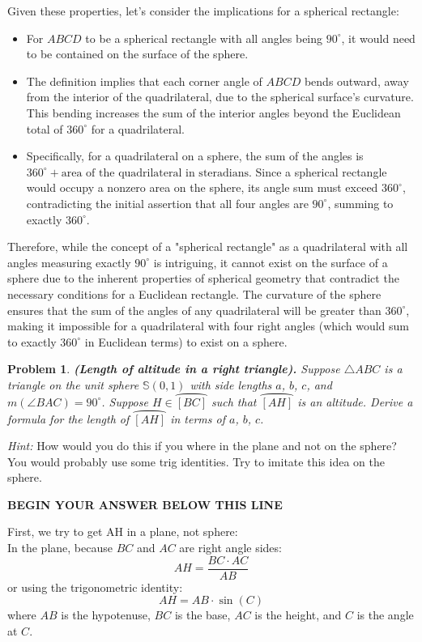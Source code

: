 \documentclass[letter,12pt]{article}
\newtheorem{problem}[main_theorem]{Problem}
\newcommand{\answerspacetop}{
	\begin{center}
		\textbf{BEGIN YOUR ANSWER BELOW THIS LINE} \\ \hrulefill
	\end{center}
}
\begin{document}
Given these properties, let's consider the implications for a spherical rectangle:
\begin{itemize}
	\item For $ABCD$ to be a spherical rectangle with all angles being $90^\circ$, it would need to be contained on the surface of the sphere.
	\item The definition implies that each corner angle of $ABCD$ bends outward, away from the interior of the quadrilateral, due to the spherical surface's curvature. This bending increases the sum of the interior angles beyond the Euclidean total of $360^\circ$ for a quadrilateral.
	\item Specifically, for a quadrilateral on a sphere, the sum of the angles is $360^\circ + \text{area of the quadrilateral in steradians}$. Since a spherical rectangle would occupy a nonzero area on the sphere, its angle sum must exceed $360^\circ$, contradicting the initial assertion that all four angles are $90^\circ$, summing to exactly $360^\circ$.
\end{itemize}

Therefore, while the concept of a "spherical rectangle" as a quadrilateral with all angles measuring exactly $90^\circ$ is intriguing, it cannot exist on the surface of a sphere due to the inherent properties of spherical geometry that contradict the necessary conditions for a Euclidean rectangle. The curvature of the sphere ensures that the sum of the angles of any quadrilateral will be greater than $360^\circ$, making it impossible for a quadrilateral with four right angles (which would sum to exactly $360^\circ$ in Euclidean terms) to exist on a sphere.
\pagebreak

\begin{problem} \textbf{(Length of altitude in a right triangle).} Suppose $\triangle ABC$ is a triangle on the unit sphere $\mathbb{S}(0, 1)$ with side lengths $a$, $b$, $c$, and $m(\angle BAC) = 90^\circ$. Suppose $H \in \wideparen{[BC]}$ such that $\wideparen{[AH]}$ is an altitude. Derive a formula for the length of $\wideparen{[AH]}$ in terms of $a$, $b$, $c$.
\end{problem}
\textit{Hint:} How would you do this if you where in the plane and not on the sphere? You
would probably use some trig identities. Try to imitate this idea on the sphere.

\answerspacetop
First, we try to get AH in a plane, not sphere:\\

In the plane, because $BC$ and $AC$ are right angle sides:
$$ AH = \frac{BC \cdot AC}{AB} $$
or using the trigonometric identity:
$$ AH = AB \cdot \sin(C) $$
where $AB$ is the hypotenuse, $BC$ is the base, $AC$ is the height, and $C$ is the angle at $C$.
\end{document}
